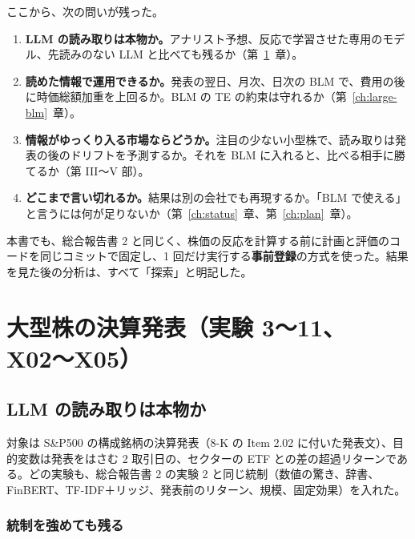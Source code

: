 \documentclass[xelatex,ja=standard,jafont=haranoaji,a4paper,10pt]{bxjsreport}
\newcommand{\SP}{S\&P500}
\newcommand{\chapref}[1]{第~\ref{#1}~章}
\begin{document}
ここから、次の問いが残った。

\begin{keybox}[本書で答える問い]
\begin{enumerate}
\item \textbf{LLM の読み取りは本物か。}アナリスト予想、反応で学習させた専用のモデル、先読みのない LLM と比べても残るか（\chapref{ch:large-read}）。
\item \textbf{読めた情報で運用できるか。}発表の翌日、月次、日次の BLM で、費用の後に時価総額加重を上回るか。BLM の TE の約束は守れるか（\chapref{ch:large-blm}）。
\item \textbf{情報がゆっくり入る市場ならどうか。}注目の少ない小型株で、読み取りは発表の後のドリフトを予測するか。それを BLM に入れると、比べる相手に勝てるか（第 III〜V 部）。
\item \textbf{どこまで言い切れるか。}結果は別の会社でも再現するか。「BLM で使える」と言うには何が足りないか（\chapref{ch:status}、\chapref{ch:plan}）。
\end{enumerate}
\end{keybox}

本書でも、総合報告書 2 と同じく、株価の反応を計算する前に計画と評価のコードを同じコミットで固定し、1 回だけ実行する\textbf{事前登録}の方式を使った。結果を見た後の分析は、すべて「探索」と明記した。

\part{大型株の決算発表（実験 3〜11、X02〜X05）}

\chapter{LLM の読み取りは本物か}\label{ch:large-read}

対象は \SP{} の構成銘柄の決算発表（8-K の Item 2.02 に付いた発表文）、目的変数は発表をはさむ 2 取引日の、セクターの ETF との差の超過リターンである。どの実験も、総合報告書 2 の実験 2 と同じ統制（数値の驚き、辞書、FinBERT、TF-IDF＋リッジ、発表前のリターン、規模、固定効果）を入れた。

\section{統制を強めても残る}
\end{document}

